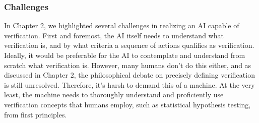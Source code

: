 





\subsubsection{Challenges}
In Chapter 2, we highlighted several challenges in realizing an AI capable of verification. First and foremost, the AI itself needs to understand what verification is, and by what criteria a sequence of actions qualifies as verification. Ideally, it would be preferable for the AI to contemplate and understand from scratch what verification is. However, many humans don't do this either, and as discussed in Chapter 2, the philosophical debate on precisely defining verification is still unresolved. Therefore, it's harsh to demand this of a machine. At the very least, the machine needs to thoroughly understand and proficiently use verification concepts that humans employ, such as statistical hypothesis testing, from first principles.


